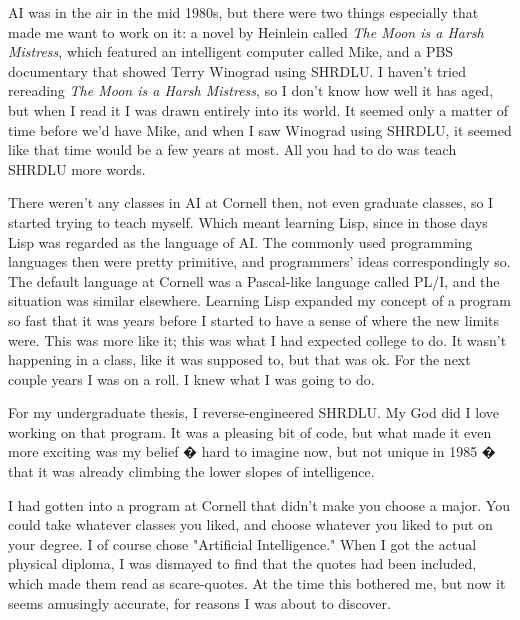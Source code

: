 AI was in the air in the mid 1980s,
                  but there were two things especially that made me want to work
                  on it: a novel by Heinlein called
                  \emph{The Moon is a Harsh Mistress}, which featured an
                  intelligent computer called Mike, and a PBS documentary that
                  showed Terry Winograd using SHRDLU. I haven't tried rereading
                  \emph{The Moon is a Harsh Mistress}, so I don't know how well
                  it has aged, but when I read it I was drawn entirely into its
                  world. It seemed only a matter of time before we'd have Mike,
                  and when I saw Winograd using SHRDLU, it seemed like that time
                  would be a few years at most. All you had to do was teach
                  SHRDLU more words.

There weren't any classes in AI
                  at Cornell then, not even graduate classes, so I started
                  trying to teach myself. Which meant learning Lisp, since in
                  those days Lisp was regarded as the language of AI. The
                  commonly used programming languages then were pretty
                  primitive, and programmers' ideas correspondingly so. The
                  default language at Cornell was a Pascal-like language called
                  PL/I, and the situation was similar elsewhere. Learning Lisp
                  expanded my concept of a program so fast that it was years
                  before I started to have a sense of where the new limits were.
                  This was more like it; this was what I had expected college to
                  do. It wasn't happening in a class, like it was supposed to,
                  but that was ok. For the next couple years I was on a roll. I
                  knew what I was going to do.

For my undergraduate
                  thesis, I reverse-engineered SHRDLU. My God did I love working
                  on that program. It was a pleasing bit of code, but what made
                  it even more exciting was my belief � hard to imagine now, but
                  not unique in 1985 � that it was already climbing the lower
                  slopes of intelligence.

I had gotten into a program
                  at Cornell that didn't make you choose a major. You could take
                  whatever classes you liked, and choose whatever you liked to
                  put on your degree. I of course chose "Artificial
                  Intelligence." When I got the actual physical diploma, I was
                  dismayed to find that the quotes had been included, which made
                  them read as scare-quotes. At the time this bothered me, but
                  now it seems amusingly accurate, for reasons I was about to
                  discover.

